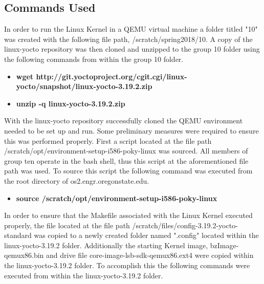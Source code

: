 \documentclass[10pt,onecolumn,draftclsnofoot]{IEEEtran} %
\begin{document}
\newpage
\begin{singlespace}
\section{\bf  Commands Used}

  \normalfont \indent In order to run the Linux Kernel in a QEMU virtual machine a folder titled "10" was created with the following file path, /scratch/spring2018/10. A copy of the linux-yocto repository was then cloned and unzipped to the group 10 folder using the following commands from within the group 10 folder.
\newline

  \begin{itemize}
    \item \textbf{wget http://git.yoctoproject.org/cgit.cgi/linux-yocto/snapshot/linux-yocto-3.19.2.zip }
    \item \textbf{unzip -q linux-yocto-3.19.2.zip}
  \end{itemize}
\hfill\break

  \normalfont \indent With the linux-yocto repository successfully cloned the QEMU environment needed to be set up and run. Some preliminary measures were required to ensure this was performed properly. First a script located at the file path /scratch/opt/environment-setup-i586-poky-linux was sourced. All members of group ten operate in the bash shell, thus this script at the aforementioned file path was used. To source this script the following command was executed from the root directory of os2.engr.oregonstate.edu.

\hfill\break
  \begin{itemize}
    \item \textbf{source /scratch/opt/environment-setup-i586-poky-linux}
  \end{itemize}
\hfill\break
  \normalfont \indent In order to ensure that the Makefile associated with the Linux Kernel executed properly, the file located at the file path /scratch/files/config-3.19.2-yocto-standard was copied to a newly created folder named ".config" located within the linux-yocto-3.19.2 folder. Additionally the starting Kernel image, bzImage-qemux86.bin and drive file core-image-lsb-sdk-qemux86.ext4 were copied within the linux-yocto-3.19.2 folder. To accomplish this the following commands were executed from within the linux-yocto-3.19.2 folder.


\end{singlespace}
\end{document}
